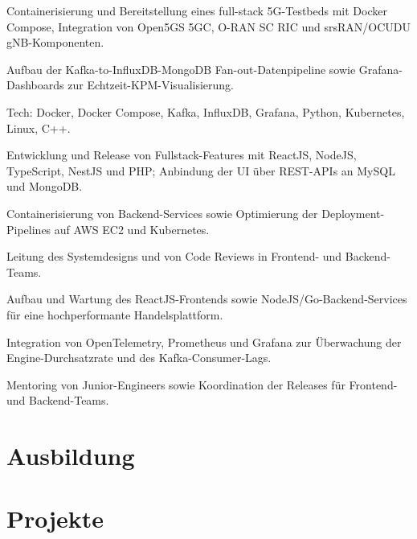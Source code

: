 \documentclass[10pt,a4paper]{resume}
\begin{document}
\bullets
  \item Containerisierung und Bereitstellung eines full-stack 5G-Testbeds mit Docker Compose, Integration von Open5GS 5GC, O-RAN SC RIC und srsRAN/OCUDU gNB-Komponenten.
  \item Aufbau der Kafka-to-InfluxDB-MongoDB Fan-out-Datenpipeline sowie Grafana-Dashboards zur Echtzeit-KPM-Visualisierung.
  \item Tech: Docker, Docker Compose, Kafka, InfluxDB, Grafana, Python, Kubernetes, Linux, C++.
\bulletsend
\vspace{1.5pt}
\bullets
  \item Entwicklung und Release von Fullstack-Features mit ReactJS, NodeJS, TypeScript, NestJS und PHP; Anbindung der UI über REST-APIs an MySQL und MongoDB.
  \item Containerisierung von Backend-Services sowie Optimierung der Deployment-Pipelines auf AWS EC2 und Kubernetes.
  \item Leitung des Systemdesigns und von Code Reviews in Frontend- und Backend-Teams.
\bulletsend
\vspace{1.5pt}
\bullets
  \item Aufbau und Wartung des ReactJS-Frontends sowie NodeJS/Go-Backend-Services für eine hochperformante Handelsplattform.
  \item Integration von OpenTelemetry, Prometheus und Grafana zur Überwachung der Engine-Durchsatzrate und des Kafka-Consumer-Lags.
  \item Mentoring von Junior-Engineers sowie Koordination der Releases für Frontend- und Backend-Teams.
\bulletsend
\vspace{1.5pt}

\section{Ausbildung}

\vspace{2pt}

\section{Projekte}
\end{document}
